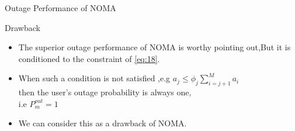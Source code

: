 \documentclass{beamer}
\begin{document}
        \begin{frame}{Outage Performance of NOMA}
            \begin{block}{Drawback}
            \begin{itemize}
                \item The superior outage performance of NOMA is worthy pointing out,But it is conditioned  to the constraint of \eqref{eq:18}.
                \item When such a condition is not satisfied ,e.g $a_j \leq \phi_j\sum_{i=j+1}^{M} a_i$ \\ then the user's outage probability is always one,  \\i.e $P_m^{out}=1$
                \item  We can consider this as a drawback of NOMA.
            \end{itemize}
            \end{block}
        \end{frame}
        
\end{document}
